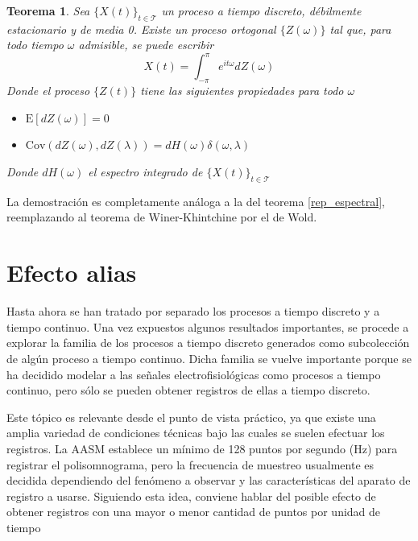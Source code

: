 \documentclass[12pt,letterpaper]{book}
\newtheorem{teorema}{Teorema}[chapter]
\newcommand{\intPI}{\int_{-\pi}^{\pi}}
\newcommand{\E}[1]{\mathrm{E}\left[ #1 \right]}
\newcommand{\Cov}[1]{\mathrm{Cov}\left( #1 \right)}
\newcommand{\abso}[1]{\left| #1 \right|}
\newcommand{\xt}{$\{X(t)\}_{t\in \mathcal{T}}$ }
\newcommand{\hz}{\si{\hertz}\xspace}
\begin{document}
\begin{teorema}
Sea \xt un proceso a tiempo discreto, débilmente estacionario y de media 0. Existe un proceso ortogonal $\{Z(\omega)\}$ tal que, para todo tiempo $\omega$ admisible, se puede escribir
\begin{equation*}
X(t) = \intPI e^{i t \omega} dZ(\omega)
\end{equation*}
Donde el proceso $\{Z(t)\}$ tiene las siguientes propiedades para todo $\omega$
\begin{itemize}
\item $\E{dZ(\omega)} = 0$
\item $\Cov{dZ(\omega),dZ(\lambda)} = dH(\omega) \delta(\omega, \lambda)$
\end{itemize}
Donde $dH(\omega)$ el espectro integrado de \xt
\label{rep_espectral2}
\end{teorema}

La demostración es completamente análoga a la del teorema \ref{rep_espectral}, reemplazando al teorema de Winer-Khintchine por el de Wold. 


\section{Efecto {alias}}

Hasta ahora se han tratado por separado los procesos a tiempo discreto y a tiempo continuo. 
%
Una vez expuestos algunos resultados importantes, se procede a explorar la familia de los procesos a tiempo discreto generados como subcolección de algún proceso a tiempo continuo. 
%
Dicha familia se vuelve importante porque se ha decidido modelar a las señales electrofisiológicas como procesos a tiempo continuo, pero sólo se pueden obtener registros de ellas a tiempo discreto.

Este tópico es relevante desde el punto de vista práctico, ya que existe una amplia variedad de condiciones técnicas bajo las cuales se suelen efectuar los registros. La AASM establece un mínimo de 128 puntos por segundo (\hz) para registrar el polisomnograma, pero la frecuencia de muestreo usualmente es decidida dependiendo del fenómeno a observar y las características del aparato de registro a usarse.
%
Siguiendo esta idea, conviene hablar del posible efecto de obtener registros con una mayor o menor cantidad de puntos por unidad de tiempo
\end{document}
